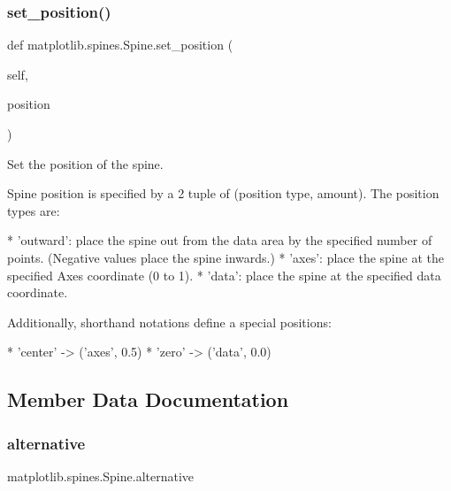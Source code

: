 \subsubsection{\texorpdfstring{set\+\_\+position()}{set\_position()}}
{\footnotesize\ttfamily def matplotlib.\+spines.\+Spine.\+set\+\_\+position (\begin{DoxyParamCaption}\item[{}]{self,  }\item[{}]{position }\end{DoxyParamCaption})}

\begin{DoxyVerb}Set the position of the spine.

Spine position is specified by a 2 tuple of (position type,
amount). The position types are:

* 'outward': place the spine out from the data area by the specified
  number of points. (Negative values place the spine inwards.)
* 'axes': place the spine at the specified Axes coordinate (0 to 1).
* 'data': place the spine at the specified data coordinate.

Additionally, shorthand notations define a special positions:

* 'center' -> ('axes', 0.5)
* 'zero' -> ('data', 0.0)
\end{DoxyVerb}
 

\subsection{Member Data Documentation}
\mbox{\label{classmatplotlib_1_1spines_1_1Spine_aa54fa12606a8f1ac3befab8a516d6868}} 
\subsubsection{\texorpdfstring{alternative}{alternative}}
{\footnotesize\ttfamily matplotlib.\+spines.\+Spine.\+alternative\hspace{0.3cm}{\ttfamily [static]}}

\mbox{\label{classmatplotlib_1_1spines_1_1Spine_ae26d71c41d1ef631eb7597043354aa97}} 
